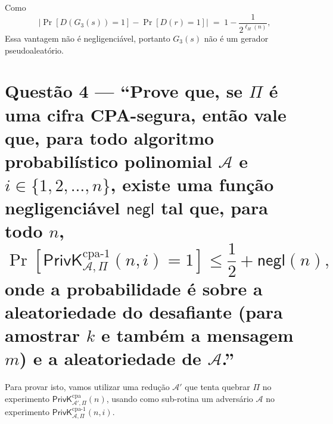 \documentclass[11pt,a4paper]{article}
\newcommand{\negl}{\mathsf{negl}}
\newcommand{\PrivKcpaI}[3]{\mathsf{PrivK}^{\mathrm{cpa}\text{-}1}_{#1,#2}(#3)}
\newcommand{\PrivKcpa}[3]{\mathsf{PrivK}^{\mathrm{cpa}}_{#1,#2}(#3)}
\newcommand{\PrivKbit}[3]{\mathsf{PrivK}^{\mathrm{cpa}\text{-}1}_{#1,#2}(#3)}
\begin{document}
Como
\[
    \bigl|\Pr[D(G_3(s)) = 1] - \Pr[D(r) = 1]\bigr|
    \;=\; 1 - \frac{1}{2^{\ell_H(n)}},
\]
Essa vantagem não é negligenciável, portanto $G_3(s)$ não é um gerador pseudoaleatório.

\clearpage

\section*{Questão 4 --- ``Prove que, se $\Pi$ é uma cifra CPA-segura, então vale que, para todo algoritmo
probabilístico polinomial $\mathcal{A}$ e $i \in \{1, 2, \dots, n\}$, existe uma
função negligenciável $\negl$ tal que, para todo $n$,
    \[
        \Pr\!\left[\PrivKcpaI{\mathcal{A}}{\Pi}{n,i} = 1\right]
        \le \frac{1}{2} + \negl(n),
    \]
    onde a probabilidade é sobre a aleatoriedade do desafiante (para amostrar $k$ e
    também a mensagem $m$) e a aleatoriedade de $\mathcal{A}$.''}

    Para provar isto, vamos utilizar uma redução $\mathcal{A}'$ que tenta quebrar $\Pi$ no
    experimento $\PrivKcpa{\mathcal{A}'}{\Pi}{n}$, usando como sub-rotina um
    adversário $\mathcal{A}$ no experimento $\PrivKbit{\mathcal{A}}{\Pi}{n,i}$.
\end{document}
